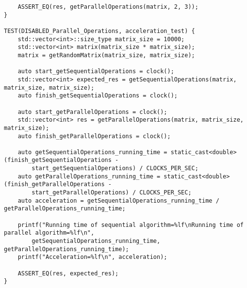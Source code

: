\documentclass{report}
\begin{document}
\begin{lstlisting}
    ASSERT_EQ(res, getParallelOperations(matrix, 2, 3));
}

TEST(DISABLED_Parallel_Operations, acceleration_test) {
    std::vector<int>::size_type matrix_size = 10000;
    std::vector<int> matrix(matrix_size * matrix_size);
    matrix = getRandomMatrix(matrix_size, matrix_size);

    auto start_getSequentialOperations = clock();
    std::vector<int> expected_res = getSequentialOperations(matrix, matrix_size, matrix_size);
    auto finish_getSequentialOperations = clock();

    auto start_getParallelOperations = clock();
    std::vector<int> res = getParallelOperations(matrix, matrix_size, matrix_size);
    auto finish_getParallelOperations = clock();

    auto getSequentialOperations_running_time = static_cast<double>(finish_getSequentialOperations -
        start_getSequentialOperations) / CLOCKS_PER_SEC;
    auto getParallelOperations_running_time = static_cast<double>(finish_getParallelOperations -
        start_getParallelOperations) / CLOCKS_PER_SEC;
    auto acceleration = getSequentialOperations_running_time / getParallelOperations_running_time;

    printf("Running time of sequential algorithm=%lf\nRunning time of parallel algorithm=%lf\n",
        getSequentialOperations_running_time, getParallelOperations_running_time);
    printf("Acceleration=%lf\n", acceleration);

    ASSERT_EQ(res, expected_res);
}
\end{lstlisting}
\end{document}
